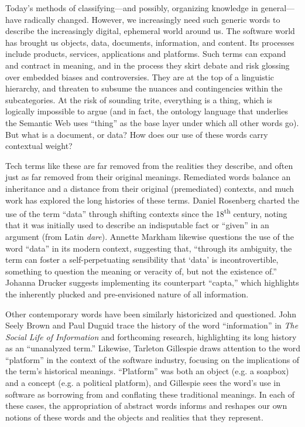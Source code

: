 Today's methods of classifying---and possibly, organizing knowledge in general---have radically changed. However, we increasingly need such generic words to describe the increasingly digital, ephemeral world around us. The software world has brought us objects, data, documents, information, and content. Its processes include products, services, applications and platforms. Such terms can expand and contract in meaning, and in the process they skirt debate and risk glossing over embedded biases and controversies. They are at the top of a linguistic hierarchy, and threaten to subsume the nuances and contingencies within the subcategories. At the risk of sounding trite, everything is a thing, which is logically impossible to argue (and in fact, the ontology language that underlies the Semantic Web uses ``thing'' as the base layer under which all other words go). But what is a document, or data? How does our use of these words carry contextual weight?

Tech terms like these are far removed from the realities they describe, and often just as far removed from their original meanings. Remediated words balance an inheritance and a distance from their original (premediated) contexts, and much work has explored the long histories of these terms. Daniel Rosenberg charted the use of the term ``data'' through shifting contexts since the 18\textsuperscript{th} century, noting that it was initially used to describe an indisputable fact or ``given'' in an argument (from Latin \emph{dare}).\autocite{rosenberg}  Annette Markham likewise questions the use of the word ``data'' in its modern context, suggesting that, ``through its ambiguity, the term can foster a self-perpetuating sensibility that `data' is incontrovertible, something to question the meaning or veracity of, but not the existence of.''\autocite{markham} Johanna Drucker suggests implementing its counterpart ``capta,'' which highlights the inherently plucked and pre-envisioned nature of all information.\autocite{drucker}

Other contemporary words have been similarly historicized and questioned. John Seely Brown and Paul Duguid trace the history of the word ``information'' in \emph{The Social Life of Information} and forthcoming research, highlighting its long history as an ``unanalyzed term.''\autocite{duguid} Likewise, Tarleton Gillespie draws attention to the word ``platform'' in the context of the software industry, focusing on the implications of the term's historical meanings.\autocite{gillespie_politics} ``Platform'' was both an object (e.g. a soapbox) and a concept (e.g. a political platform), and Gillespie sees the word's use in software as borrowing from and conflating these traditional meanings. In each of these cases, the appropriation of abstract words informs and reshapes our own notions of these words and the objects and realities that they represent.

